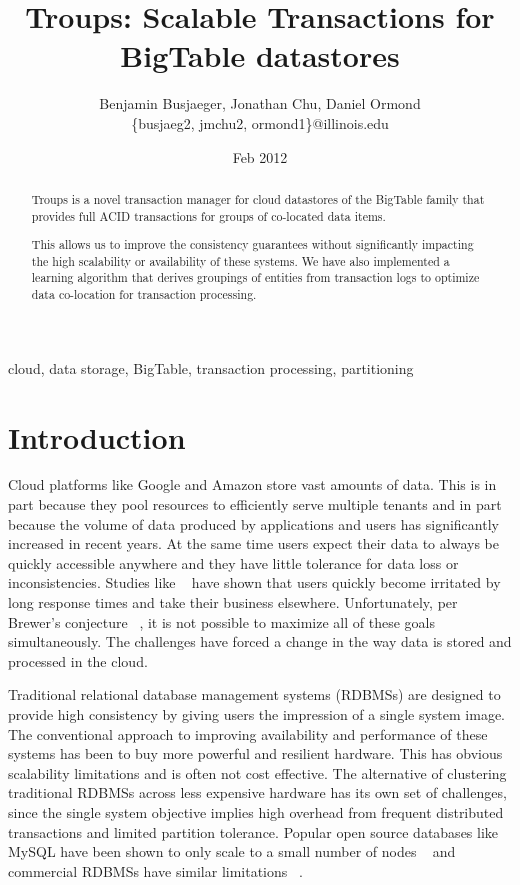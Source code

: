 \documentclass[10pt,final,journal]{IEEEtran}
\begin{document}
\title{Troups: Scalable Transactions for BigTable datastores}
\author{Benjamin Busjaeger, Jonathan Chu, Daniel Ormond \\
\{busjaeg2, jmchu2, ormond1\}@illinois.edu}
\date{Feb 2012}
\maketitle

\begin{abstract}
Troups is a novel transaction manager for cloud datastores of the BigTable family that provides full ACID transactions for groups of co-located data items.

This allows us to improve the consistency guarantees without significantly impacting the high scalability or availability of these systems. We have also implemented a learning algorithm that derives groupings of entities from transaction logs to optimize data co-location for transaction processing.
\end{abstract}

\begin{IEEEkeywords}
cloud, data storage, BigTable, transaction processing, partitioning
\end{IEEEkeywords}

\section{Introduction}
Cloud platforms like Google and Amazon store vast amounts of data. This is in part because they pool resources to efficiently serve multiple tenants and in part because the volume of data produced by applications and users has significantly increased in recent years. At the same time users expect their data to always be quickly accessible anywhere and they have little tolerance for data loss or inconsistencies. Studies like ~\cite{Ramsay:1998} have shown that users quickly become  irritated by long response times and take their business elsewhere. Unfortunately, per Brewer's conjecture ~\cite{gilbert2002brewer}, it is not possible to maximize all of these goals simultaneously. The challenges have forced a change in the way data is stored and processed in the cloud.

Traditional relational database management systems (RDBMSs) are designed to provide high consistency by giving users the impression of a single system image. The conventional approach to improving availability and performance of these systems has been to buy more powerful and resilient hardware. This has obvious scalability limitations and is often not cost effective. The alternative of clustering traditional RDBMSs across less expensive hardware has its own set of challenges, since the single system objective implies high overhead from frequent distributed transactions and limited partition tolerance. Popular open source databases like MySQL have been shown to only scale to a small number of nodes ~\cite{Malkowski:2010:EAD:1774088.1774449} and commercial RDBMSs have similar limitations ~\cite{Campbell:2010:ESF:1807167.1807280}.
\end{document}
